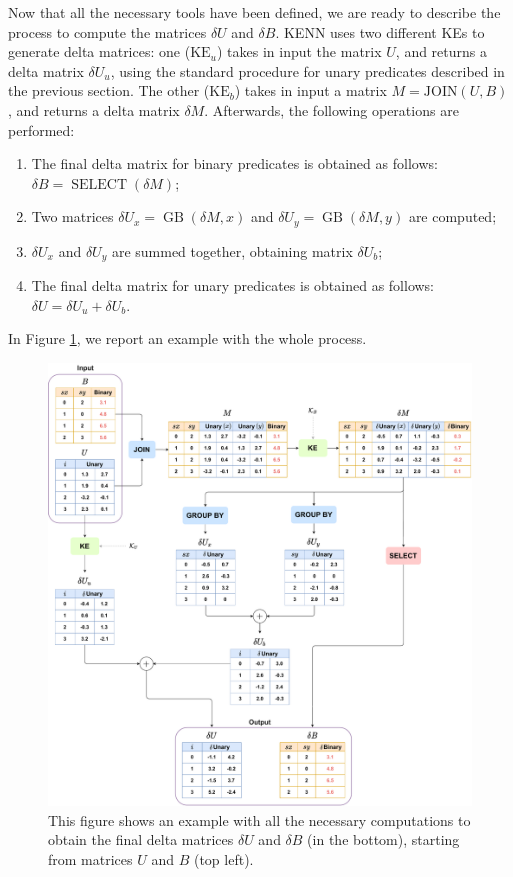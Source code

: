 Now that all the necessary tools have been defined, we are ready to describe the process to compute the matrices $\delta U$ and $\delta B$. KENN uses two different KEs to generate delta matrices: one ($\text{KE}_u$) takes in input the matrix $U$, and returns a delta matrix $\delta U_u$, using the standard procedure for unary predicates described in the previous section. The other ($\text{KE}_b$) takes in input a matrix $M=\text{JOIN}(U,B)$, and returns a delta matrix $\delta M$. Afterwards, the following operations are performed:
\begin{enumerate}
	\item The final delta matrix for binary predicates is obtained as follows: $\delta B = \operatorname{SELECT}(\delta M)$;
	\item Two matrices $\delta U_x = \operatorname{GB}(\delta M, x)$ and $\delta U_y = \operatorname{GB}(\delta M, y)$ are computed;
	\item $\delta U_x$ and $\delta U_y$ are summed together, obtaining matrix $\delta U_b$;
	\item The final delta matrix for unary predicates is obtained as follows: $\delta U = \delta U_u + \delta U_b$.
\end{enumerate}
In Figure \ref{fig:kenn_rel_global_scheme}, we report an example with the whole process.


\begin{figure}
	\centering
	\includegraphics[width=\linewidth]{figures/kenn_relational_global_chart.pdf}
	\caption{This figure shows an example with all the necessary computations to obtain the final delta matrices $\delta U$ and $\delta B$ (in the bottom), starting from matrices $U$ and $B$ (top left).}
	\label{fig:kenn_rel_global_scheme}
\end{figure}
 
